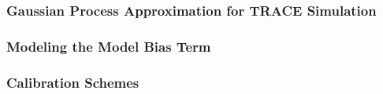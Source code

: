 \subsubsection{Gaussian Process Approximation for TRACE Simulation}\label{subsub:bc_gp_trace}

\subsubsection{Modeling the Model Bias Term}\label{subsub:bc_model_bias}

\subsubsection{Calibration Schemes}\label{subsub:bc_calibration schemes}

